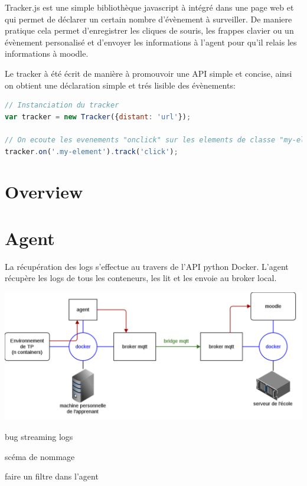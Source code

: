 \documentclass[a4paper,11pt]{report}
\begin{document}
Tracker.js est une simple bibliothèque javascript à intégré dans une page web et qui permet de déclarer un certain nombre d'évènement à surveiller.
De maniere pratique cela permet d'enregistrer les cliques de souris, les frappes clavier ou un évènement personalisé et d'envoyer les informations à l'agent pour qu'il relais les informations à moodle.

Le tracker à été écrit de manière à promouvoir une API simple et concise, ainsi on obtient une déclaration simple et trés lisible des évènements:

\begin{lstlisting}[language=javascript, caption={Exemple d'utilisation de tracker.js}]
// Instanciation du tracker
var tracker = new Tracker({distant: 'url'});

// On ecoute les evenements "onclick" sur les elements de classe "my-element"
tracker.on('.my-element').track('click');
\end{lstlisting}

\section{Overview}

\section{Agent}

La récupération des logs s'effectue au travers de l'API python Docker\cite{docker-py}.
L'agent récupère les logs de tous les conteneurs, les lit et les envoie au broker local.

\includegraphics[scale=0.45]{docker}

bug streaming logs

scéma de nommage


faire un filtre dans l'agent
\end{document}
